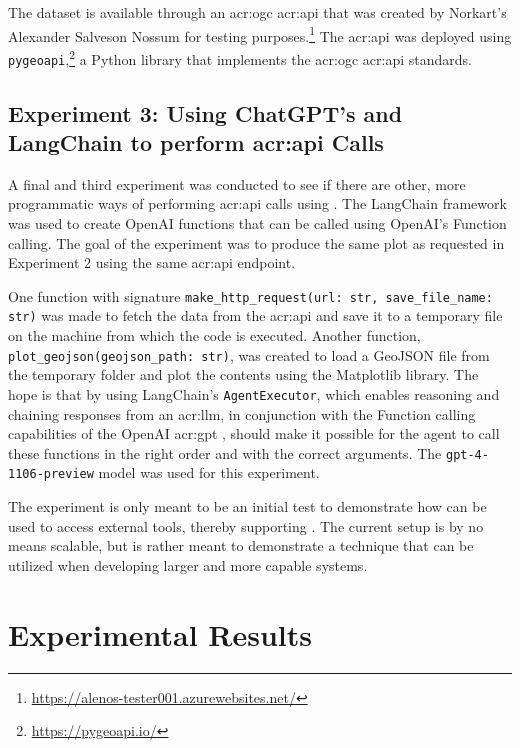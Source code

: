 The dataset is available through an \acrshort{acr:ogc} \acrshort{acr:api} that was created by Norkart's Alexander Salveson Nossum for testing purposes.\footnote{\url{https://alenos-tester001.azurewebsites.net/}} The \acrshort{acr:api} was deployed using \texttt{pygeoapi},\footnote{\url{https://pygeoapi.io/}} a Python library that implements the \acrshort{acr:ogc} \acrshort{acr:api} standards.

\subsection[Experiment 3: Using ChatGPT's and LangChain to perform API Call]{Experiment 3: Using ChatGPT's and LangChain to perform \acrshort{acr:api} Calls}\label{subsec:ex-3-setup}

A final and third experiment was conducted to see if there are other, more programmatic ways of performing \acrshort{acr:api} calls using . The LangChain framework \citep{chaseLangChain2022} was used to create OpenAI functions that can be called using OpenAI's Function calling. The goal of the experiment was to produce the same plot as requested in Experiment 2 using the same \acrshort{acr:api} endpoint.

One function with signature \texttt{make\_http\_request(url: str, save\_file\_name: str)} was made to fetch the data from the \acrshort{acr:api} and save it to a temporary file on the machine from which the code is executed. Another function, \texttt{plot\_geojson(geojson\_path: str)}, was created to load a GeoJSON file from the temporary folder and plot the contents using the Matplotlib library. The hope is that by using LangChain's \texttt{AgentExecutor}, which enables reasoning and chaining responses from an \acrshort{acr:llm}, in conjunction with the Function calling capabilities of the OpenAI \acrshort{acr:gpt} , should make it possible for the agent to call these functions in the right order and with the correct arguments. The \texttt{gpt-4-1106-preview} model was used for this experiment.

The experiment is only meant to be an initial test to demonstrate how  can be used to access external tools, thereby supporting . The current setup is by no means scalable, but is rather meant to demonstrate a technique that can be utilized when developing larger and more capable systems.

\section{Experimental Results}\label{sec:experimental-results}

